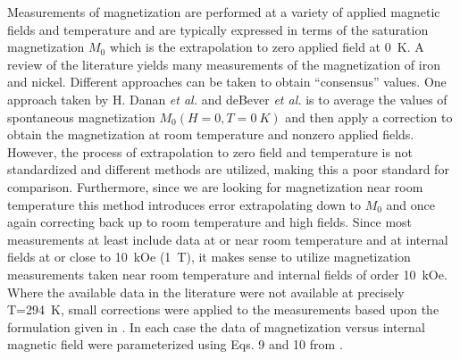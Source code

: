 \documentclass[preprint,12pt]{elsarticle}
\begin{document}
Measurements of magnetization are performed at a variety of applied magnetic fields and temperature and are typically expressed in terms of the saturation magnetization $M_0$ which is the extrapolation to zero applied field at 0~K\cite{Crangle1971}. A review of the literature yields many measurements of the magnetization of iron and nickel. Different approaches can be taken to obtain ``consensus'' values. One approach taken by H. Danan {\it et al.}\cite{Danan1968} and deBever {\it et al.} \cite{deBever1997} is to average the values of spontaneous magnetization $M_0(H=0, T=0~K)$ and then apply a correction to obtain the magnetization at room temperature and nonzero applied fields. However, the process of extrapolation to zero field and temperature is not standardized and different methods are utilized, making this a poor standard for comparison. Furthermore, since we are looking for magnetization near room temperature this method introduces error extrapolating down to $M_0$ and once again correcting back up to room temperature and high fields. Since most measurements at least include data at or near room temperature and at internal fields at or close to 10~kOe (1~T), it makes sense to utilize magnetization measurements taken near room temperature and internal fields of order 10~kOe. Where the available data in the literature were not available at precisely T=294~K, small corrections were applied to the measurements based upon the formulation given in \cite{PauthenetMar1982}. In each case the data of magnetization versus internal magnetic field were parameterized using Eqs. 9 and 10 from \cite{PauthenetMar1982}.
\end{document}
